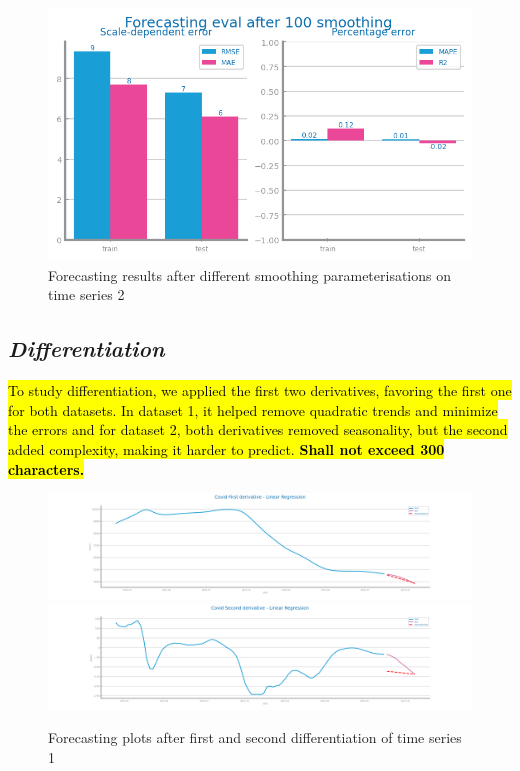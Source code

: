 \documentclass[10pt]{extarticle}
\newcommand{\ctext}[3][RGB]{%
  \begingroup
  \definecolor{hlcolor}{#1}{#2}\sethlcolor{hlcolor}%
  \hl{#3}%
  \endgroup
}
\begin{document}
\begin{figure}[H]
\includegraphics[scale=0.5]{images/dataset2/time_series/fts_forecast_eval_after_smooth_ws_100.png}
\caption{Forecasting results after different smoothing parameterisations on time series 2}
\end{figure}

\subsection*{\textit{Differentiation}}
\ctext[RGB]{190,190,190}{To study differentiation, we applied the first two derivatives, favoring the first one for both datasets. In dataset 1, it helped remove quadratic trends and minimize the errors and for dataset 2, both derivatives removed seasonality, but the second added complexity, making it harder to predict. \textbf{Shall not exceed 300 characters.}}

\begin{figure}[H]
\centering\includegraphics[scale=0.4]{images/dataset1/time_series/Covid First derivative - Linear Regression_forecasting_series.png}
\includegraphics[scale=0.4]{images/dataset1/time_series/Covid Second derivative - Linear Regression_forecasting_series.png}
\caption{Forecasting plots after first and second differentiation of time series 1}
\end{figure}
\end{document}
